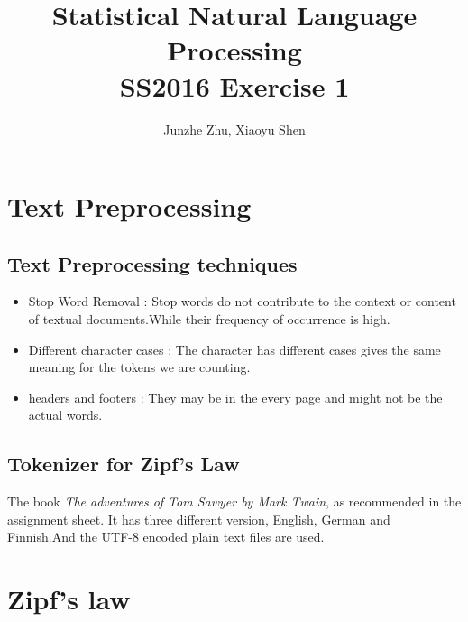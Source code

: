 \documentclass[a4paper]{article}
\title{Statistical Natural Language Processing \\SS2016  Exercise 1}
\author{Junzhe Zhu, Xiaoyu Shen}
\begin{document}
\maketitle

\section{Text Preprocessing}


\subsection{Text Preprocessing techniques}
\begin{itemize}
\item{Stop Word Removal }:
Stop words  do  not  contribute  to  the  context  or content  of  textual  documents.While their frequency of occurrence is high.
\item{Different character cases}
: The character has different cases gives the same meaning for the tokens we are counting.

\item{ headers and footers }:
They may be in the every page and might not be the actual words.
\end{itemize}



\subsection{Tokenizer for Zipf’s Law}
The book  \textit{The adventures of Tom Sawyer by Mark Twain}, as recommended in the assignment sheet. It has three different version, English, German and Finnish.And the UTF-8 encoded plain text files are used.


\section{Zipf's law}
\end{document}
